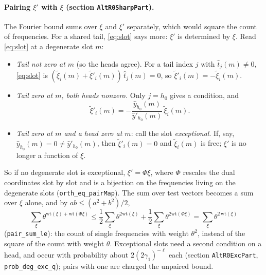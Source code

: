 \documentclass[11pt]{article}
\theoremstyle{definition}
\theoremstyle{remark}
\newcommand{\lean}[1]{\texttt{#1}}
\begin{document}
\paragraph{Pairing $\xi'$ with $\xi$ (section \lean{AltR0SharpPart}).}
The Fourier bound sums over $\xi$ and $\xi'$ separately, which would square the count of
frequencies. For a shared tail, \eqref{eq:slot} says more: $\xi'$ is determined by $\xi$. Read
\eqref{eq:slot} at a degenerate slot $m$:
\begin{itemize}
\item \emph{Tail not zero at $m$} (so the heads agree). For a tail index $j$ with
  $\hat t_j(m)\ne0$, \eqref{eq:slot} is $(\tilde\xi_i(m)+\tilde\xi'_i(m))\,\hat t_j(m)=0$, so
  $\tilde\xi'_i(m) = -\tilde\xi_i(m)$.
\item \emph{Tail zero at $m$, both heads nonzero.} Only $j = h_0$ gives a condition, and
  \[ \tilde\xi'_i(m) = -\frac{\hat y_{h_0}(m)}{\hat y'_{h_0}(m)}\,\tilde\xi_i(m). \]
\item \emph{Tail zero at $m$ and a head zero at $m$}: call the slot \emph{exceptional}. If,
  say, $\hat y_{h_0}(m)=0\ne\hat y'_{h_0}(m)$, then $\tilde\xi'_i(m) = 0$ and $\tilde\xi_i(m)$ is
  free; $\xi'$ is no longer a function of $\xi$.
\end{itemize}
So if no degenerate slot is exceptional, $\xi' = \Phi\xi$, where $\Phi$ rescales the dual
coordinates slot by slot and is a bijection on the frequencies living on the degenerate slots
(\lean{orth\_eq\_pairMap}). The sum over test vectors becomes a sum over $\xi$ alone, and by
$ab\le(a^2+b^2)/2$,
\[
  \sum_{\xi}\theta^{\mathrm{wt}(\xi) + \mathrm{wt}(\Phi\xi)}
  \le \frac12\sum_\xi\theta^{2\mathrm{wt}(\xi)} + \frac12\sum_\xi\theta^{2\mathrm{wt}(\Phi\xi)}
  = \sum_\xi \theta^{2\,\mathrm{wt}(\xi)}
\]
(\lean{pair\_sum\_le}): the count of single frequencies with weight $\theta^2$, instead of the
square of the count with weight $\theta$. Exceptional slots need a second condition on a head,
and occur with probability about $2(2\gamma_1)^{-\ell}$ each (section \lean{AltR0ExcPart},
\lean{prob\_deg\_exc\_q}); pairs with one are charged the unpaired bound.
\end{document}
